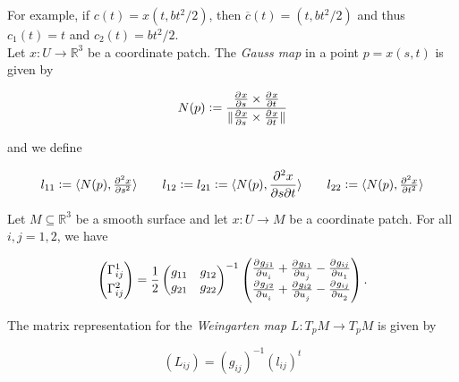 \vspace{1mm}

For example, if $c(t) = x(t,bt^2/2)$, then $\overline{c}(t) = (t,bt^2/2)$ and thus $c_1(t) = t$ and $c_2(t) = bt^2/2$.\\
Let $x: U \to \mathbb{R}^3$ be a coordinate patch. The \emph{Gauss map} in a point $p = x(s,t)$ is given by 

\begin{equation}
	N(p) := \frac{\pd{x}{s} \times \pd{x}{t}}{\norm[0]{\pd{x}{s} \times \pd{x}{t}}} 
\end{equation}

and we define

\begin{equation}
	l_{11} := \langle N(p), \pd[2]{x}{s} \rangle \qquad l_{12} := l_{21} := \langle N(p), \frac{\partial^2 x}{\partial s\partial t}\rangle \qquad 	l_{22} := \langle N(p), \pd[2]{x}{t} \rangle 
\end{equation}

\vspace{1mm}

\begin{lemma}
	Let $M \subseteq \mathbb{R}^3$ be a smooth surface and let $x: U \to M$ be a coordinate patch. For all $i,j = 1,2$, we have 

	\begin{equation}
		\begin{pmatrix}
			\Gamma^1_{ij}\\[3pt]
			\Gamma^2_{ij}
		\end{pmatrix}
		= \frac{1}{2}\begin{pmatrix}
			g_{11} & g_{12}\\
			g_{21} & g_{22}
		\end{pmatrix}^{-1}
		\begin{pmatrix}
			\pd{g_{j1}}{u_i} + \pd{g_{i1}}{u_j} - \pd{g_{ij}}{u_1}\\
			\pd{g_{j2}}{u_i} + \pd{g_{i2}}{u_j} - \pd{g_{ij}}{u_2}
		\end{pmatrix}.
	\end{equation}
\end{lemma}

\vspace{1mm}

The matrix representation for the \emph{Weingarten map} $L: T_pM \to T_pM$ is given by 

\begin{equation}
	(L_{ij}) = (g_{ij})^{-1}(l_{ij})^t
\end{equation}

